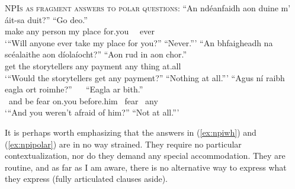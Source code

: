 \documentclass[output=paper,colorlinks,citecolor=brown]{langscibook}
\begin{document}
\ea\label{ex:npipolar}
{\scshape NPIs as fragment answers to polar questions}:
\ea
\gll “An ndéanfaidh aon duine m' áit-sa duit?” “{Go deo}.” \\
     {\interr} {make\fut} any person my place for.you {\ \ ever} \\ \label{ex:atfs}
\glt `“Will anyone ever take my place for you?” \quad “Never.”'
\ex
\gll “An bhfaigheadh na scéalaithe aon díolaíocht?”  “Aon rud {in aon chor}.”\\
     {\interr} {get\pasthabit} the storytellers any payment any thing {at.all}\\ \label{ex:al88}
\glt `“Would the storytellers get any payment?” “Nothing at all.”'
\ex
\gll “Agus ní raibh eagla ort roimhe?” {\ \ } “Eagla {ar bith}.”\\
     {\ and} {\no} {be\past} fear {on.you} {before.him} {} {\ fear} {\ any} \\
\glt `“And you weren't afraid of him?” “Not at all.”'
\z
\z
{}

\noindent It is perhaps worth emphasizing that the answers in (\ref{ex:npiwh}) and (\ref{ex:npipolar}) are in no way strained. They require no particular contextualization, nor do they demand any special accommodation. They are routine, and as far as I am aware, there is no alternative way to express what they express (fully articulated clauses aside).
\end{document}
